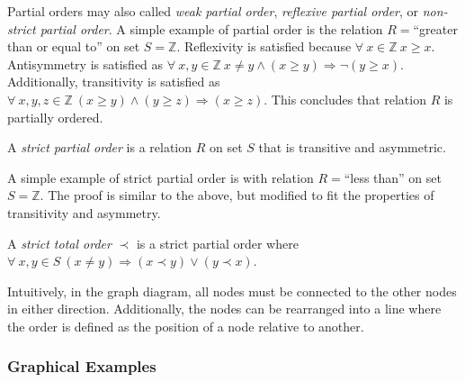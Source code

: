 Partial orders may also called \emph{weak partial order}, \emph{reflexive partial order}, or \emph{non-strict partial order}.
A simple example of partial order is the relation \(R=\)``greater than or equal to'' on set \(S=\mathbb{Z}\). Reflexivity is
satisfied because \(\forall\:x\in\mathbb{Z}\:x\ge x\). Antisymmetry is satisfied as 
\(\forall\:x,y\in\mathbb{Z}\:x\ne y\land(x\ge y)\Rightarrow\lnot(y\ge x)\). Additionally, transitivity is satisfied as
\(\forall\:x,y,z\in\mathbb{Z}\:(x\ge y)\land(y\ge z)\Rightarrow(x\ge z)\). This concludes that relation \(R\) is partially
ordered.

\bigskip
\begin{definition}
    A \emph{strict partial order} is a relation \(R\) on set \(S\) that is transitive and asymmetric.    
\end{definition}

A simple example of strict partial order is with relation \(R=\)``less than'' on set \(S=\mathbb{Z}\). The proof is similar to the
above, but modified to fit the properties of transitivity and asymmetry. 

\bigskip
\begin{definition}
    A \emph{strict total order} \(\prec\) is a strict partial order where \(\forall\:x,y\in S\:(x\ne y)\Rightarrow(x\prec y)\lor(y\prec x)\).
\end{definition}

Intuitively, in the graph diagram, all nodes must be connected to the other nodes in either direction. Additionally, the nodes can 
be rearranged into a line where the order is defined as the position of a node relative to another.

\subsubsection{Graphical Examples}

